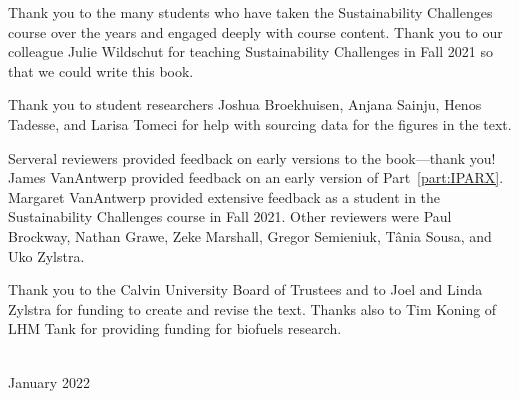 \thispagestyle{plain}

\noindent
Thank you to the many students who have taken the Sustainability Challenges course 
over the years and engaged deeply with course content.
Thank you to our colleague Julie Wildschut for teaching Sustainability Challenges in Fall 2021 so
that we could write this book.

Thank you to student researchers Joshua Broekhuisen, Anjana Sainju, 
Henos Tadesse, and Larisa Tomeci
for help with sourcing data for the figures in the text. 

Serveral reviewers provided feedback on early versions to the book---thank you!
James VanAntwerp provided feedback on an early version of Part~\ref{part:IPARX}.
Margaret VanAntwerp provided extensive feedback as a student in the
Sustainability Challenges course in Fall 2021.
Other reviewers were Paul Brockway, Nathan Grawe, Zeke Marshall,
Gregor Semieniuk, T\^{a}nia Sousa, and Uko Zylstra.


Thank you to the Calvin University Board of Trustees and 
to Joel and Linda Zylstra
for funding to create and revise the text.
Thanks also to Tim Koning of LHM Tank for providing funding for biofuels research.



\vspace*{2pc}
\noindent\AUTHORS\\
\noindent January 2022
 
\clearpage

\blankpage
